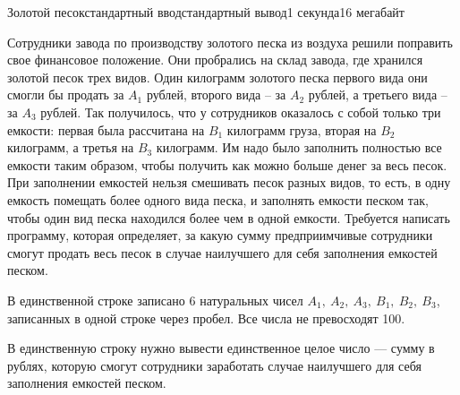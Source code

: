 \begin{problem}{Золотой песок}{стандартный ввод}{стандартный вывод}{1 секунда}{16 мегабайт}

Сотрудники завода по производству золотого песка из воздуха решили поправить свое финансовое положение. Они пробрались на склад завода, где хранился золотой песок трех видов. Один килограмм золотого песка первого вида они смогли бы продать за $A_1$ рублей, второго вида -- за $A_2$ рублей, а третьего вида -- за $A_3$ рублей. Так получилось, что у сотрудников оказалось с собой только три емкости: первая была рассчитана на $B_1$ килограмм груза, вторая на $B_2$ килограмм, а третья на $B_3$ килограмм. Им надо было заполнить полностью все емкости таким образом, чтобы получить как можно больше денег за весь песок. При заполнении емкостей нельзя смешивать песок разных видов, то есть, в одну емкость помещать более одного вида песка, и заполнять емкости песком так, чтобы один вид песка находился более чем в одной емкости.
Требуется написать программу, которая определяет, за какую сумму предприимчивые сотрудники смогут продать весь песок в случае наилучшего для себя заполнения емкостей песком.

\InputFile
В единственной строке записано 6 натуральных чисел $A_1,~A_2,~A_3,~B_1,~B_2,~B_3$, записанных в одной строке через пробел. Все числа не превосходят 100.

\OutputFile
В единственную строку нужно вывести единственное целое число --- сумму в рублях, которую смогут сотрудники заработать случае наилучшего для себя заполнения емкостей песком.

\Example

\begin{example}
%
\end{example}

\end{problem}

